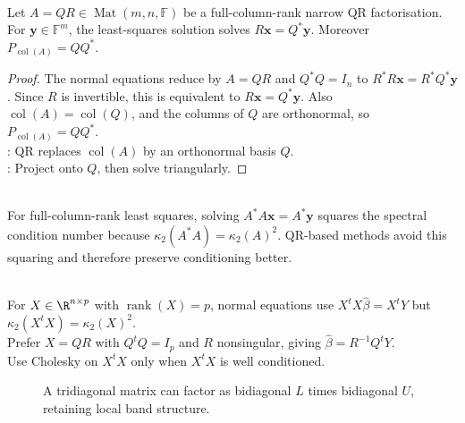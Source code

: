 \begin{proposition} \label{prop:qr-least-squares-and-projection} \\
Let $A=QR\in\operatorname{Mat}(m,n,\mathbb{F})$ be a full-column-rank narrow QR factorisation. For $\mathbf{y}\in\mathbb{F}^m$, the least-squares solution solves $R\mathbf{x}=Q^*\mathbf{y}$. Moreover $P_{\operatorname{col}(A)}=QQ^*$.
\begin{proof}
The normal equations reduce by $A=QR$ and $Q^*Q=I_n$ to $R^*R\mathbf{x}=R^*Q^*\mathbf{y}$.
Since $R$ is invertible, this is equivalent to $R\mathbf{x}=Q^*\mathbf{y}$. Also $\operatorname{col}(A)=\operatorname{col}(Q)$, and the columns of $Q$ are orthonormal, so $P_{\operatorname{col}(A)}=QQ^*$.\\
: QR replaces $\operatorname{col}(A)$ by an orthonormal basis $Q$.\\
: Project onto $Q$, then solve triangularly.
\end{proof}
\end{proposition}

\begin{perspective} \label{per:normal-equations-squaring-condition-number} \\
For full-column-rank least squares, solving $A^*A\mathbf{x}=A^*\mathbf{y}$ squares the spectral condition number because $\kappa_2(A^*A)=\kappa_2(A)^2$. QR-based methods avoid this squaring and therefore preserve conditioning better.
\end{perspective}

\begin{perspective} \label{per:linear-model-numerical-solution-route} \\
For $X\in\R^{n\times p}$ with $\operatorname{rank}(X)=p$, normal equations use $X^tX\widehat{\beta}=X^tY$ but $\kappa_2(X^tX)=\kappa_2(X)^2$.\\
Prefer $X=QR$ with $Q^tQ=I_p$ and $R$ nonsingular, giving $\widehat{\beta}=R^{-1}Q^tY$.\\
Use Cholesky on $X^tX$ only when $X^tX$ is well conditioned.
\end{perspective}

\begin{figure}[H]
  \centering
  
  \caption{A tridiagonal matrix can factor as bidiagonal $L$ times bidiagonal $U$, retaining local band structure.}
  \label{fig:band-matrix-lu-structure}
\end{figure}

